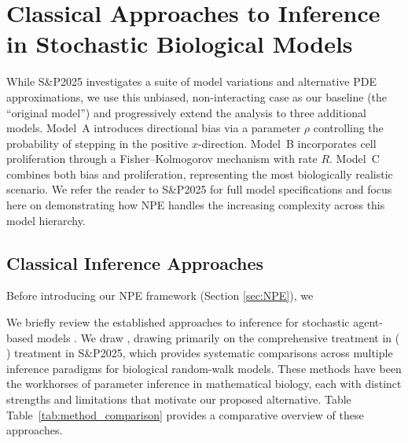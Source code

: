 \documentclass{article}
\newcommand{\SP}{S\&P2025}
\providecommand{\DIFaddtex}[1]{{\protect\color{blue} \sf #1}} %
\providecommand{\DIFdeltex}[1]{{\protect\color{red} \scriptsize #1}} %
\providecommand{\DIFaddbegin}{} %
\providecommand{\DIFaddend}{} %
\providecommand{\DIFdelbegin}{} %
\providecommand{\DIFdelend}{} %
\providecommand{\DIFadd}[1]{\texorpdfstring{\DIFaddtex{#1}}{#1}} %
\providecommand{\DIFdel}[1]{\texorpdfstring{\DIFdeltex{#1}}{}} %
\newcommand{\DIFscaledelfig}{0.5}
\newlength{\DIFdelgraphicswidth} %
\newlength{\DIFdelgraphicsheight} %
\newcommand{\DIFaddincludegraphics}[2][]{{\color{blue}\fbox{\DIFOincludegraphics[#1]{#2}}}} %
\newcommand{\DIFdelincludegraphics}[2][]{%
\sbox{\DIFdelgraphicsbox}{\DIFOincludegraphics[#1]{#2}}%
\settoboxwidth{\DIFdelgraphicswidth}{\DIFdelgraphicsbox} %
\settoboxtotalheight{\DIFdelgraphicsheight}{\DIFdelgraphicsbox} %
\scalebox{\DIFscaledelfig}{%
\parbox[b]{\DIFdelgraphicswidth}{\usebox{\DIFdelgraphicsbox}\\[-\baselineskip] \rule{\DIFdelgraphicswidth}{0em}}\llap{\resizebox{\DIFdelgraphicswidth}{\DIFdelgraphicsheight}{%
\setlength{\unitlength}{\DIFdelgraphicswidth}%
\begin{picture}(1,1)%
\thicklines\linethickness{2pt} %
{\color[rgb]{1,0,0}\put(0,0){\framebox(1,1){}}}%
{\color[rgb]{1,0,0}\put(0,0){\line( 1,1){1}}}%
{\color[rgb]{1,0,0}\put(0,1){\line(1,-1){1}}}%
\end{picture}%
}\hspace*{3pt}}} %
} %
\DeclareRobustCommand{\DIFaddbegin}{\DIFOaddbegin \let\includegraphics\DIFaddincludegraphics} %
\DeclareRobustCommand{\DIFaddend}{\DIFOaddend \let\includegraphics\DIFOincludegraphics} %
\DeclareRobustCommand{\DIFdelbegin}{\DIFOdelbegin \let\includegraphics\DIFdelincludegraphics} %
\DeclareRobustCommand{\DIFdelend}{\DIFOaddend \let\includegraphics\DIFOincludegraphics} %
\begin{document}
\DIFdelbegin \section{\DIFdel{Classical Approaches to Inference in Stochastic Biological Models}}%
\addtocounter{section}{-1}%
\DIFdelend \DIFaddbegin \DIFadd{While \SP{} investigates a suite of model variations and alternative PDE approximations, we use this unbiased, non-interacting case as our baseline (the ``original model'') and progressively extend the analysis to three additional models. Model~A introduces directional bias via a parameter $\rho$ controlling the probability of stepping in the positive $x$-direction. Model~B incorporates cell proliferation through a Fisher--Kolmogorov mechanism with rate $R$. Model~C combines both bias and proliferation, representing the most biologically realistic scenario. We refer the reader to \SP{} for full model specifications and focus here on demonstrating how NPE handles the increasing complexity across this model hierarchy.
}



\subsection{\DIFadd{Classical Inference Approaches}}\DIFaddend \label{sec:classical_inference}
\DIFdelbegin \DIFdel{Before introducing our NPE framework (Section \ref{sec:NPE}), we }\DIFdelend \DIFaddbegin 

\DIFadd{We }\DIFaddend briefly review the established approaches to inference for stochastic agent-based models\DIFdelbegin \DIFdel{. We draw }\DIFdelend \DIFaddbegin \DIFadd{, drawing }\DIFaddend primarily on the \DIFdelbegin \DIFdel{comprehensive treatment in \cite{Simpson2025.05.25.656057} (}%
\DIFdel{)}\DIFdelend \DIFaddbegin \DIFadd{treatment in \SP}\DIFaddend , which provides systematic comparisons across multiple inference paradigms for biological random-walk models. \DIFdelbegin \DIFdel{These methods have been the workhorses of parameter inference in mathematical biology, each with distinct strengths and limitations that motivate our proposed alternative. Table}\DIFdelend \DIFaddbegin \DIFadd{Table~}\DIFaddend \ref{tab:method_comparison} provides a comparative overview\DIFdelbegin \DIFdel{of these approaches}\DIFdelend .
\end{document}
